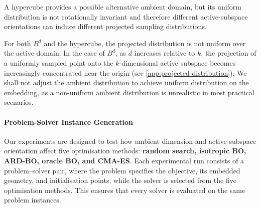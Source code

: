 \documentclass[10pt]{article}
\begin{document}
A hypercube provides a possible alternative ambient domain, but its uniform distribution is not rotationally invariant and therefore different active-subspace orientations can induce different projected sampling distributions.

For both $B^d$ and the hypercube, the projected distribution is not uniform over the active domain. In the case of $B^d$, as $d$ increases relative to $k$, the projection of a uniformly sampled point onto the $k$-dimensional active subspace becomes increasingly concentrated near the origin (see \cref{app:projected-distribution}). We shall not adjust the ambient distribution to achieve uniform distribution on the embedding, as a non-uniform ambient distribution is unrealistic in most practical scenarios. 


\paragraph{Problem-Solver Instance Generation}
Our experiments are designed to test how ambient dimension and active-subspace orientation affect five optimisation methods: \textbf{random search, isotropic BO, ARD-BO, oracle BO, and CMA-ES}. Each experimental run consists of a problem--solver pair, where the problem specifies the objective, its embedded geometry, and initialisation points, while the solver is selected from the five optimisation methods. This ensures that every solver is evaluated on the same problem instances.
\end{document}
